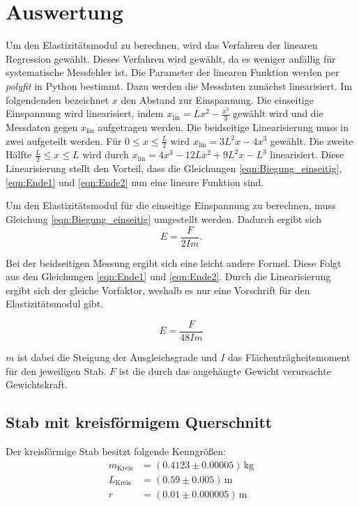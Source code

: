 %

%
\section{Auswertung}
Um den Elastizitätsmodul zu berechnen, wird das Verfahren der linearen Regression gewählt. Dieses Verfahren wird gewählt, 
da es weniger anfällig für systematische Messfehler ist. Die Parameter der linearen Funktion werden per \emph{polyfit} in Python 
bestimmt. Dazu werden die Messdaten 
zunächst linearisiert. Im folgendenden bezeichnet $x$ den Abstand zur Einspannung.
Die einseitige Einspannung wird linearisiert, indem $x_\text{lin} = L x^2 - \frac{x^3}{3}$ 
gewählt wird und die Messdaten gegen $x_\text{lin}$ aufgetragen werden.
Die beidseitige Linearisierung muss in zwei aufgeteilt werden. Für $0 \leq x \leq \frac{L}{2} $ wird 
$x_\text{lin} = 3L^2 x - 4x^3 $ gewählt. Die zweite Hälfte $\frac{L}{2} \leq x \leq L$ wird durch 
$x_\text{lin} = 4x^3 - 12 L x^2 + 9L^2 x -L^3 $ linearisiert.
Diese Linearisierung stellt den Vorteil, dass die Gleichungen \eqref{eqn:Biegung_einseitig}, \eqref{eqn:Ende1} und 
\eqref{eqn:Ende2} nun eine lineare Funktion sind. 

\noindent Um den Elastizitätsmodul für die einseitige Einspannung zu berechnen, muss Gleichung \eqref{eqn:Biegung_einseitig} 
umgestellt werden. Dadurch ergibt sich 
\begin{equation}
    E=\frac{F}{2Im}.
    \label{eqn:E_e}
\end{equation}

\noindent Bei der beidseitigen Messung ergibt sich eine leicht andere Formel. Diese Folgt aus den Gleichungen \eqref{eqn:Ende1} 
und \eqref{eqn:Ende2}. Durch die Linearisierung ergibt sich der gleiche Vorfaktor, weshalb es nur eine Vorschrift für 
den Elastizitätsmodul gibt.

\begin{equation}
    E = \frac{F}{48 I m}
    \label{eqn:E_b}
\end{equation}

\noindent $m$ ist dabei die Steigung der Ausgleichsgrade und $I$ das Flächenträgheitsmoment für den jeweiligen Stab. 
$F$ ist die durch das angehängte Gewicht verursachte Gewichtskraft.

\label{sec:Auswertung}

\subsection{Stab mit kreisförmigem Querschnitt}
\label{sec:rund}
Der kreisförmige Stab besitzt folgende Kenngrößen:
\begin{align*}
    m_\text{Kreis} &= \left(0.4123 \pm 0.00005\right)\,\unit{\kilo \gram} \\
    L_\text{Kreis} &= \left(0.59 \pm 0.005\right)\,\unit{\meter}\\
    r &= \left(0.01 \pm 0.000005\right) \, \unit{\meter}
\end{align*}


